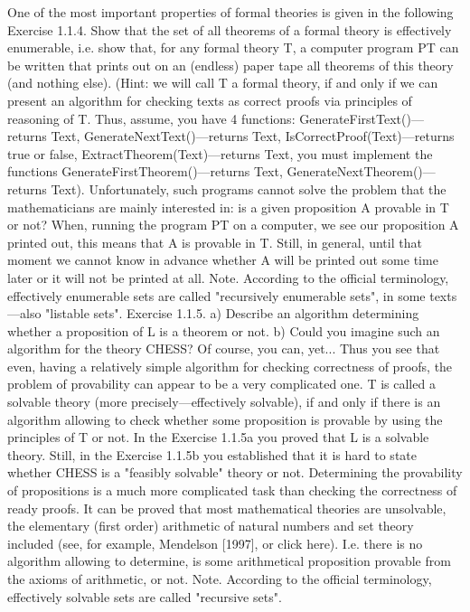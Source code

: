 One of the most important properties of formal theories is given in the following
Exercise 1.1.4. Show that the set of all theorems of a formal theory is effectively enumerable, i.e.
show that, for any formal theory T, a computer program PT can be written that prints out on an (endless)
paper tape all theorems of this theory (and nothing else). (Hint: we will call T a formal theory, if and only
if we can present an algorithm for checking texts as correct proofs via principles of reasoning of T. Thus,
assume, you have 4 functions: GenerateFirstText()---returns Text, GenerateNextText()---returns Text,
IsCorrectProof(Text)---returns true or false, ExtractTheorem(Text)---returns Text, you must implement the
functions GenerateFirstTheorem()---returns Text, GenerateNextTheorem()---returns Text).
Unfortunately, such programs cannot solve the problem that the mathematicians are mainly
interested in: is a given proposition A provable in T or not? When, running the program PT on a
computer, we see our proposition A printed out, this means that A is provable in T. Still, in general, until
that moment we cannot know in advance whether A will be printed out some time later or it will not be
printed at all.
Note. According to the official terminology, effectively enumerable sets are called "recursively
enumerable sets", in some texts---also "listable sets".
Exercise 1.1.5. a) Describe an algorithm determining whether a proposition of L is a theorem or not.
b) Could you imagine such an algorithm for the theory CHESS? Of course, you can, yet... Thus you see
that even, having a relatively simple algorithm for checking correctness of proofs, the problem of
provability can appear to be a very complicated one.
T is called a solvable theory (more precisely---effectively solvable), if and only if there is an algorithm
allowing to check whether some proposition is provable by using the principles of T or not. In the
Exercise 1.1.5a you proved that L is a solvable theory. Still, in the Exercise 1.1.5b you established that it
is hard to state whether CHESS is a "feasibly solvable" theory or not. Determining the provability of
propositions is a much more complicated task than checking the correctness of ready proofs. It can
be proved that most mathematical theories are unsolvable, the elementary (first order) arithmetic of
natural numbers and set theory included (see, for example, Mendelson [1997], or click here). I.e. there is
no algorithm allowing to determine, is some arithmetical proposition provable from the axioms of
arithmetic, or not.
Note. According to the official terminology, effectively solvable sets are called "recursive sets".
